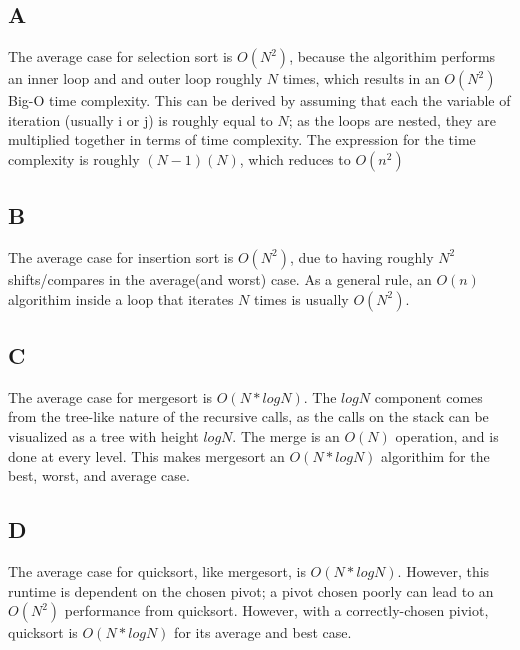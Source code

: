 \documentclass[12pt]{article} %
\begin{document}
\section{}
\subsection{A}
The average case for selection sort is $O(N^2)$, because the algorithim performs an inner loop and and outer loop roughly $N$ times, which results in an $O(N^2)$ Big-O time complexity. This can be derived by assuming that each the variable of iteration (usually i or j) is roughly equal to $N$; as the loops are nested, they are multiplied together in terms of time complexity. The expression for the time complexity is roughly $(N-1)(N)$, which reduces to $O(n^2)$
\subsection{B}
The average case for insertion sort is $O(N^2)$, due to having roughly $N^2$ shifts/compares in the average(and worst) case. As a general rule, an $O(n)$ algorithim inside a loop that iterates $N$ times is usually $O(N^2)$.
\subsection{C}
The average case for mergesort is $O(N*log N)$. The $log N$ component comes from the tree-like nature of the recursive calls, as the calls on the stack can be visualized as a tree with height $log N$. The merge is an $O(N)$ operation, and is done at every level. This makes mergesort an $O(N*log N)$ algorithim for the best, worst, and average case.
\subsection{D}
The average case for quicksort, like mergesort, is $O(N*log N)$. However, this runtime is dependent on the chosen pivot; a pivot chosen poorly can lead to an $O(N^2)$ performance from quicksort. However, with a correctly-chosen piviot, quicksort is $O(N*log N)$ for its average and best case.
\end{document}
